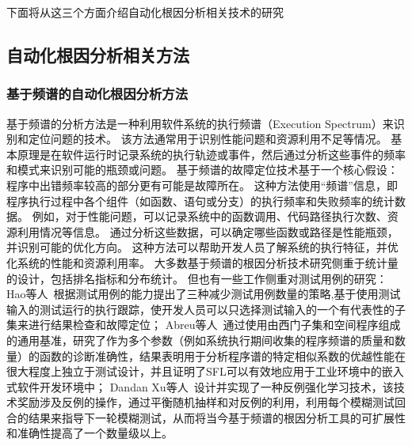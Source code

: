 下面将从这三个方面介绍自动化根因分析相关技术的研究
\subsection{自动化根因分析相关方法}
\subsubsection{基于频谱的自动化根因分析方法}
基于频谱的分析方法是一种利用软件系统的执行频谱（Execution Spectrum）来识别和定位问题的技术。
该方法通常用于识别性能问题和资源利用不足等情况。
基本原理是在软件运行时记录系统的执行轨迹或事件，然后通过分析这些事件的频率和模式来识别可能的瓶颈或问题。
基于频谱的故障定位技术基于一个核心假设：程序中出错频率较高的部分更有可能是故障所在。
这种方法使用“频谱”信息，即程序执行过程中各个组件（如函数、语句或分支）的执行频率和失败频率的统计数据。
例如，对于性能问题，可以记录系统中的函数调用、代码路径执行次数、资源利用情况等信息。
通过分析这些数据，可以确定哪些函数或路径是性能瓶颈，并识别可能的优化方向。
这种方法可以帮助开发人员了解系统的执行特征，并优化系统的性能和资源利用率。
大多数基于频谱的根因分析技术研究侧重于统计量的设计，包括排名指标和分布统计。
但也有一些工作侧重对测试用例的研究：
Hao等人~\cite{Test2010}根据测试用例的能力提出了三种减少测试用例数量的策略,基于使用测试输入的测试运行的执行跟踪，使开发人员可以只选择测试输入的一个有代表性的子集来进行结果检查和故障定位；
Abreu等人~\cite{practical2009}通过使用由西门子集和空间程序组成的通用基准，研究了作为多个参数（例如系统执行期间收集的程序频谱的质量和数量）的函数的诊断准确性，结果表明用于分析程序谱的特定相似系数的优越性能在很大程度上独立于测试设计，并且证明了SFL可以有效地应用于工业环境中的嵌入式软件开发环境中；
Dandan Xu等人~\cite{Racing}设计并实现了一种反例强化学习技术，该技术奖励涉及反例的操作，通过平衡随机抽样和对反例的利用，利用每个模糊测试回合的结果来指导下一轮模糊测试，从而将当今基于频谱的根因分析工具的可扩展性和准确性提高了一个数量级以上。

